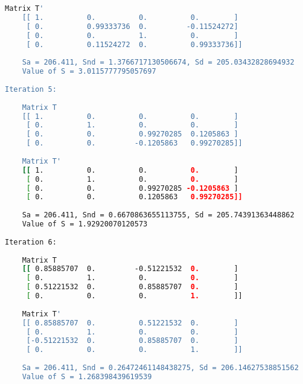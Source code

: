 \documentclass[a4paper,14pt]{extarticle} %
\begin{document}
\begin{lstlisting}[language=bash, stringstyle=\small\ttfamily, emphstyle={[1]\small\ttfamily}, frame=none, numbers=none]
    Matrix T'
    [[ 1.          0.          0.          0.        ]
     [ 0.          0.99333736  0.         -0.11524272]
     [ 0.          0.          1.          0.        ]
     [ 0.          0.11524272  0.          0.99333736]]
    
    Sa = 206.411, Snd = 1.3766717130506674, Sd = 205.03432828694932
    Value of S = 3.0115777795057697
    
Iteration 5:
    
    Matrix T
    [[ 1.          0.          0.          0.        ]
     [ 0.          1.          0.          0.        ]
     [ 0.          0.          0.99270285  0.1205863 ]
     [ 0.          0.         -0.1205863   0.99270285]]
    
    Matrix T'
    [[ 1.          0.          0.          0.        ]
     [ 0.          1.          0.          0.        ]
     [ 0.          0.          0.99270285 -0.1205863 ]
     [ 0.          0.          0.1205863   0.99270285]]
    
    Sa = 206.411, Snd = 0.6670863655113755, Sd = 205.74391363448862
    Value of S = 1.92920070120573
    
Iteration 6:
    
    Matrix T
    [[ 0.85885707  0.         -0.51221532  0.        ]
     [ 0.          1.          0.          0.        ]
     [ 0.51221532  0.          0.85885707  0.        ]
     [ 0.          0.          0.          1.        ]]
    
    Matrix T'
    [[ 0.85885707  0.          0.51221532  0.        ]
     [ 0.          1.          0.          0.        ]
     [-0.51221532  0.          0.85885707  0.        ]
     [ 0.          0.          0.          1.        ]]
    
    Sa = 206.411, Snd = 0.26472461148438275, Sd = 206.14627538851562
    Value of S = 1.268398439619539

\end{lstlisting}
\end{document}
